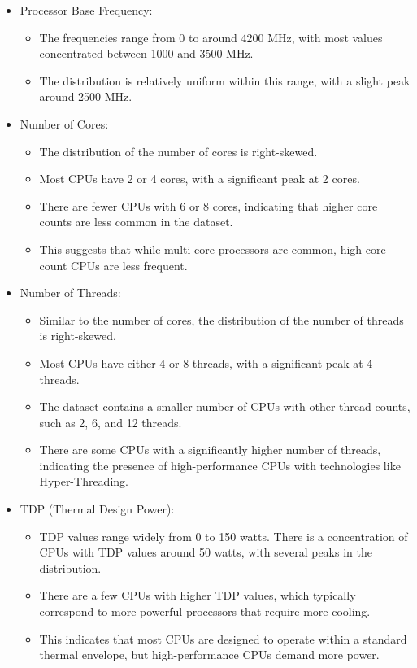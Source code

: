 \begin{itemize}
    \item Processor Base Frequency: 
    \begin{itemize}
        \item The frequencies range from 0 to around 4200 MHz, with most values concentrated between 1000 and 3500 MHz. 
        \item The distribution is relatively uniform within this range, with a slight peak around 2500 MHz.
    \end{itemize}
    
    \item Number of Cores: 
    \begin{itemize}
        \item The distribution of the number of cores is right-skewed.
        \item Most CPUs have 2 or 4 cores, with a significant peak at 2 cores. 
        \item There are fewer CPUs with 6 or 8 cores, indicating that higher core counts are less common in the dataset.
        \item This suggests that while multi-core processors are common, high-core-count CPUs are less frequent.        
    \end{itemize}

    \item Number of Threads: 
    \begin{itemize}
        \item Similar to the number of cores, the distribution of the number of threads is right-skewed.
        \item Most CPUs have either 4 or 8 threads, with a significant peak at 4 threads. 
        \item The dataset contains a smaller number of CPUs with other thread counts, such as 2, 6, and 12 threads.
        \item There are some CPUs with a significantly higher number of threads, indicating the presence of high-performance CPUs with technologies like Hyper-Threading.     
    \end{itemize}

    \item TDP (Thermal Design Power):
    \begin{itemize}
        \item TDP values range widely from 0 to 150 watts. There is a concentration of CPUs with TDP values around 50 watts, with several peaks in the distribution.
        \item There are a few CPUs with higher TDP values, which typically correspond to more powerful processors that require more cooling.
        \item This indicates that most CPUs are designed to operate within a standard thermal envelope, but high-performance CPUs demand more power.
    \end{itemize}


\end{itemize}
